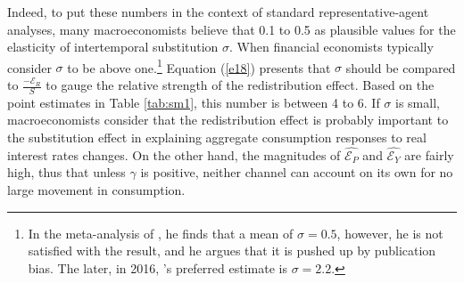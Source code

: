 \documentclass[11pt,letterpaper]{article}
\begin{document}
Indeed, to put these numbers in the context of standard representative-agent analyses, many macroeconomists believe that 0.1 to 0.5 as plausible values for the elasticity of intertemporal substitution $\sigma$. When financial economists typically consider $\sigma$ to be above one.\footnote{In the meta-analysis of \citet{Havranek2015}, he finds that a mean of $\sigma = 0.5$, however, he is not satisfied with the result, and he argues that it is pushed up by publication bias. The later, in 2016, \citeauthor{Bansal2016}’s preferred estimate is $\sigma = 2.2$.} Equation (\ref{e18}) presents that $\sigma$ should be compared to $\frac{-\mathcal{E}_{R}}{S}$ to gauge the relative strength of the redistribution effect. Based on the point estimates in Table \ref{tab:sm1}, this number is between 4 to 6. If $\sigma$ is small, macroeconomists consider that the redistribution effect is probably important to the substitution effect in explaining aggregate consumption responses to real interest rates changes. On the other hand, the magnitudes of $\widehat{\mathcal{E}_{P}}$ and $\widehat{\mathcal{E}_{Y}}$ are fairly high, thus that unless $\gamma$ is positive, neither channel can account on its own for no large movement in consumption.

\begin{table}[H]
	\centering
	\caption{Estimated redistribution elasticities $\mathcal{E}_{R}$ for the duration scenarios}
	\label{tab:m5}

	
\end{table}
\end{document}
